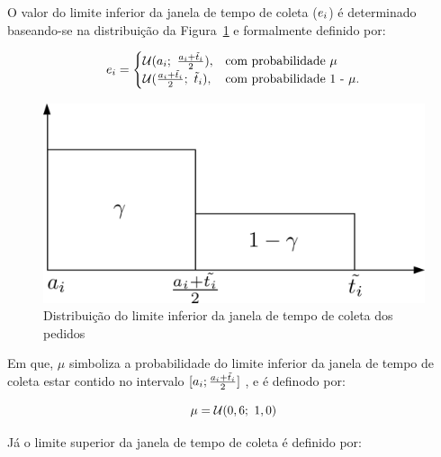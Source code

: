 O valor do limite inferior da janela de tempo de coleta
($e_i$) é determinado baseando-se na 
distribuição da Figura~\ref{fig:gendreau2006_distribution} e formalmente 
definido por:

\begin{equation}
  e_i = 
    \begin{cases}
      \mathcal{U}(a_i;\ \frac{a_i + \Tilde{t}_i}{2}), 
        & \text{com probabilidade $\mu$} \\
      \mathcal{U}(\frac
        {a_i + \Tilde{t}_i}{2};\ \Tilde{t}_i), 
        & \text{com probabilidade 1 - $\mu$}.
    \end{cases}
\label{eq:gendreau2006_earliestTimewindow}
\end{equation}

\begin{figure}[h]
    \centering
    \includegraphics{fig/gendreau2006_distribution.png}
    \caption{Distribuição do limite inferior da janela de tempo de coleta dos
             pedidos \cite{gendreau_neighborhood_2006}}
    \label{fig:gendreau2006_distribution}
\end{figure}

Em que, $\mu$ simboliza a probabilidade do limite inferior da janela de
tempo de coleta estar contido no intervalo 
$[a_i; \frac{a_i + \Tilde{t}_i}{2}]$
, e é definodo por:

\begin{equation}
  \mu = \mathcal{U}(0,6;\ 1,0)
\end{equation}

Já o limite superior da janela de tempo de coleta é definido por:

